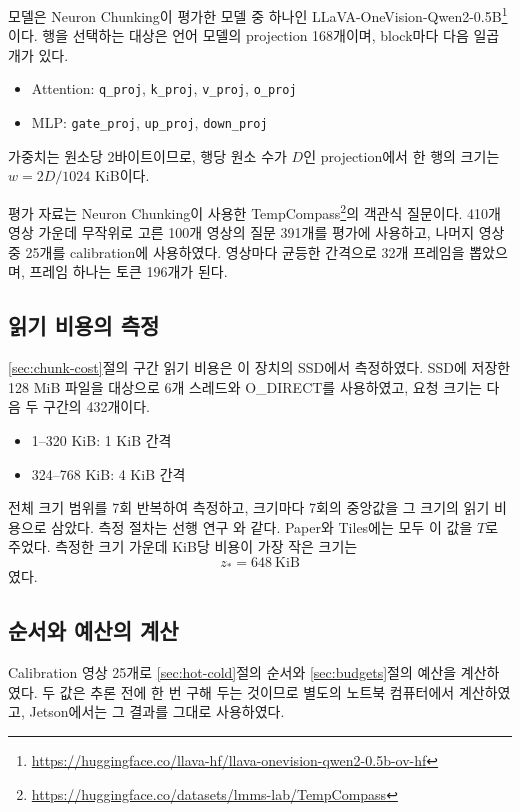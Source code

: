모델은 Neuron Chunking이 평가한 모델 중 하나인 LLaVA-OneVision-Qwen2-0.5B\footnote{\url{https://huggingface.co/llava-hf/llava-onevision-qwen2-0.5b-ov-hf}}이다. 행을 선택하는 대상은 언어 모델의 projection 168개이며, block마다 다음 일곱 개가 있다.

\begin{itemize}
\item Attention: \texttt{q\_proj}, \texttt{k\_proj}, \texttt{v\_proj}, \texttt{o\_proj}
\item MLP: \texttt{gate\_proj}, \texttt{up\_proj}, \texttt{down\_proj}
\end{itemize}

가중치는 원소당 2바이트이므로, 행당 원소 수가 $D$인 projection에서 한 행의 크기는 $w=2D/1024$ KiB이다.

평가 자료는 Neuron Chunking이 사용한 TempCompass\footnote{\url{https://huggingface.co/datasets/lmms-lab/TempCompass}}의 객관식 질문이다. 410개 영상 가운데 무작위로 고른 100개 영상의 질문 391개를 평가에 사용하고, 나머지 영상 중 25개를 calibration에 사용하였다. 영상마다 균등한 간격으로 32개 프레임을 뽑았으며, 프레임 하나는 토큰 196개가 된다.

\subsection{읽기 비용의 측정}\label{sec:exp-cost}

\ref{sec:chunk-cost}절의 구간 읽기 비용은 이 장치의 SSD에서 측정하였다. SSD에 저장한 128 MiB 파일을 대상으로 6개 스레드와 O\_DIRECT를 사용하였고, 요청 크기는 다음 두 구간의 432개이다.

\begin{itemize}
\item 1--320 KiB: 1 KiB 간격
\item 324--768 KiB: 4 KiB 간격
\end{itemize}

전체 크기 범위를 7회 반복하여 측정하고, 크기마다 7회의 중앙값을 그 크기의 읽기 비용으로 삼았다. 측정 절차는 선행 연구 \cite{seol2026}와 같다. Paper와 Tiles에는 모두 이 값을 $T$로 주었다. 측정한 크기 가운데 KiB당 비용이 가장 작은 크기는
\[
z_\ast=648\ \mathrm{KiB}
\]
였다.

\subsection{순서와 예산의 계산}\label{sec:exp-calibration}

Calibration 영상 25개로 \ref{sec:hot-cold}절의 순서와 \ref{sec:budgets}절의 예산을 계산하였다. 두 값은 추론 전에 한 번 구해 두는 것이므로 별도의 노트북 컴퓨터에서 계산하였고, Jetson에서는 그 결과를 그대로 사용하였다.

